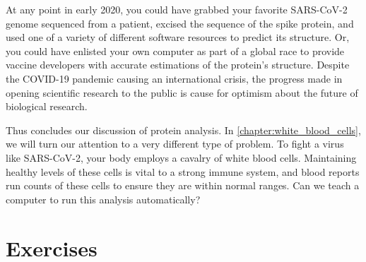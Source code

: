 At any point in early 2020, you could have grabbed your favorite SARS-CoV-2 genome sequenced from a patient, excised the sequence of the spike protein, and used one of a variety of different software resources to predict its structure. Or, you could have enlisted your own computer as part of a global race to provide vaccine developers with accurate estimations of the protein's structure. Despite the COVID-19 pandemic causing an international crisis, the progress made in opening scientific research to the public is cause for optimism about the future of biological research.

Thus concludes our discussion of protein analysis. In \autoref{chapter:white_blood_cells}, we will turn our attention to a very different type of problem. To fight a virus like SARS-CoV-2, your body employs a cavalry of white blood cells. Maintaining healthy levels of these cells is vital to a strong immune system, and blood reports run counts of these cells to ensure they are within normal ranges. Can we teach a computer to run this analysis automatically?\\

\FloatBarrier
\section{Exercises}
\label{sec:coronavirus_exercises}

\begin{exercise}\end{exercise}
